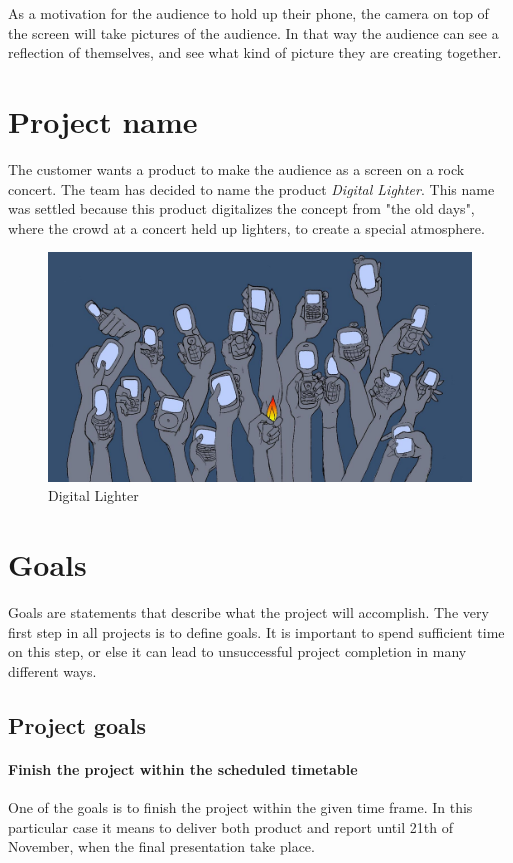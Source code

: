 As a motivation for the audience to hold up their phone, the camera on top of the screen will take pictures of the audience.
In that way the audience can see a reflection of themselves, and see what kind of picture they are creating together.

\section{Project name}
The customer wants a product to make the audience as a screen on a rock concert. 
The team has decided to name the product \emph{Digital Lighter}. 
This name was settled because this product digitalizes the concept from "the old days", where the crowd at a concert held up lighters, to create a special atmosphere. 

\begin{figure}[hbt]
\centering
\includegraphics[width=\textwidth]{introduction/phones.jpg}
\caption{Digital Lighter}
\label{fig:digital lighter}
\end{figure}


\section{Goals}
Goals are statements that describe what the project will accomplish. 
The very first step in all projects is to define goals. 
It is important to spend sufficient time on this step, or else it can lead to unsuccessful project completion in many different ways. 
   
\label{sec:project-goals}

\subsection{Project goals}

\paragraph{Finish the project within the scheduled timetable}
One of the goals is to finish the project within the given time frame. 
In this particular case it means to deliver both product and report until 21th of November, when the final presentation take place.

